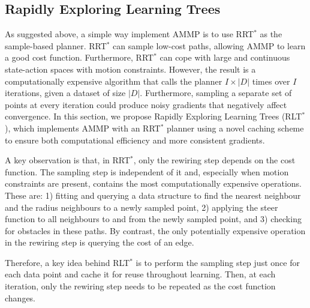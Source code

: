 \documentclass[letterpaper, 10 pt, conference]{ieeeconf}
\begin{document}
\subsection{Rapidly Exploring Learning Trees \label{subsec:cached}}

As suggested above, a simple way implement AMMP is to use RRT$^*$ as the sample-based planner.  RRT$^*$ can sample low-cost paths, allowing AMMP to learn a good cost function. Furthermore, RRT$^*$ can cope with large and continuous state-action spaces with motion constraints. However, the result is a computationally expensive algorithm that calls the planner $I\times|D|$ times over $I$ iterations, given a dataset of size $|D|$. Furthermore, sampling a separate set of points at every iteration could produce noisy gradients that negatively affect convergence. In this section, we propose Rapidly Exploring Learning Trees (RLT$^*$), which implements AMMP with an RRT$^*$ planner using a novel caching scheme to ensure both computational efficiency and more consistent gradients.

A key observation is that, in RRT$^*$, only the rewiring step depends on the cost function.  The sampling step is independent of it and, especially when motion constraints are present, contains the most computationally expensive operations. These are: 1) fitting and querying a data structure to find the nearest neighbour and the radius neighbours to a newly sampled point, 2) applying the steer function to all neighbours to and from the newly sampled point, and 3) checking for obstacles in these paths. By contrast,  the only potentially expensive operation in the rewiring step is querying the cost of an edge. 

Therefore, a key idea behind RLT$^*$ is to perform the sampling step just once for each data point and cache it for reuse throughout learning. Then, at each iteration, only the rewiring step needs to be repeated as the cost function changes.
\end{document}
